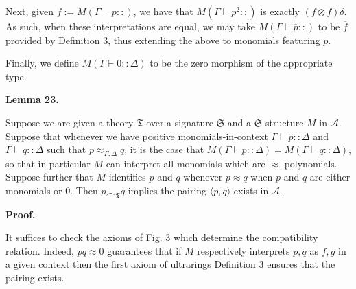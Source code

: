  
  
 
 
Next, given $f:=M\left(\Gamma\vdash p::\right)$, we have that $M\left(\Gamma\vdash p^{2}::\right)$ is exactly $(f\otimes f)\delta$. As such, when these interpretations are equal, we may take $M\left(\Gamma\vdash\overline{p}::\right)$ to be $\overline{f}$ provided by Definition 3, thus extending the above to monomials featuring $\overline{p}$.\par
 
 
 
Finally, we define $M\left(\Gamma\vdash 0::\Delta\right)$ to be the zero morphism of the appropriate type.\par
 
 
 
\par\medskip\noindent\textbf{Lemma 23.}\par
 
 
Suppose we are given a theory $\mathfrak{T}$ over a signature $\mathfrak{S}$ and a $\mathfrak{S}$-structure $M$ in $\mathcal{A}$. Suppose that whenever we have positive monomials-in-context $\Gamma\vdash p::\Delta$ and $\Gamma\vdash q::\Delta$ such that $p\approx_{\Gamma,\Delta}q$, it is the case that $M(\Gamma\vdash p::\Delta)=M(\Gamma\vdash q::\Delta)$, so that in particular $M$ can interpret all monomials which are $\approx$-polynomials. Suppose further that $M$ identifies $p$ and $q$ whenever $p\approx q$ when $p$ and $q$ are either monomials or $0$. Then $p\frown_{\mathfrak{T}}q$ implies the pairing $\langle p,q\rangle$ exists in $\mathcal{A}$.\par
 
 
 
 
\par\medskip\noindent\textbf{Proof.}\par
 
 
It suffices to check the axioms of Fig. 3 which determine the compatibility relation. Indeed, $pq\approx 0$ guarantees that if $M$ respectively interprets $p,q$ as $f,g$ in a given context then the first axiom of ultrarings Definition 3 ensures that the pairing exists.\par
 
